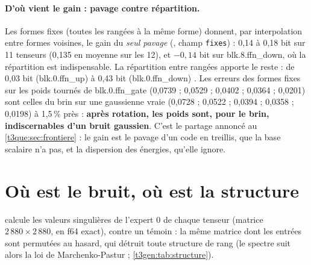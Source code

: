 \paragraph{D'où vient le gain : pavage contre répartition.} Les formes fixes (toutes les rangées à la même forme) donnent, par interpolation entre formes voisines, le gain du \emph{seul pavage} (, champ \texttt{fixes}) : 0,14 à 0,18 bit sur 11 tenseurs (0,135 en moyenne sur les 12), et $-0{,}14$ bit sur blk.8.ffn\_down, où la répartition est indispensable. La répartition entre rangées apporte le reste : de 0,03 bit (blk.0.ffn\_up) à 0,43 bit (blk.0.ffn\_down) \mes. Les erreurs des formes fixes sur les poids tournés de blk.0.ffn\_gate (0,0739 ; 0,0529 ; 0,0402 ; 0,0364 ; 0,0201) sont celles du brin sur une gaussienne vraie (0,0728 ; 0,0522 ; 0,0394 ; 0,0358 ; 0,0198) à 1,5\,\% près : \textbf{après rotation, les poids sont, pour le brin, indiscernables d'un bruit gaussien}. C'est le partage annoncé au \cref{t3que:sec:frontiere} : le gain est le pavage d'un code en treillis, que la base scalaire n'a pas, et la dispersion des énergies, qu'elle ignore.

\section{Où est le bruit, où est la structure}\label{t3gen:sec:structure}

 calcule les valeurs singulières de l'expert 0 de chaque tenseur (matrice $2\,880 \times 2\,880$, en f64 exact), contre un témoin : la même matrice dont les entrées sont permutées au hasard, qui détruit toute structure de rang (le spectre suit alors la loi de Marchenko-Pastur ; \cref{t3gen:tab:structure}).

